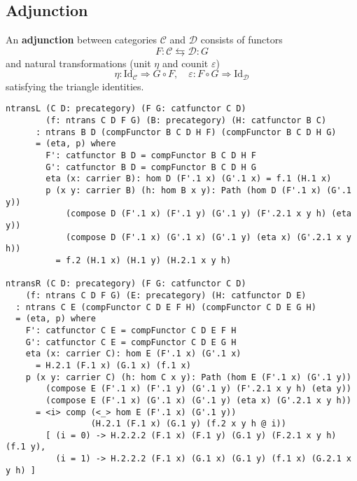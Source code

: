 \documentclass{article}
\begin{document}
\subsection{Adjunction}
An \textbf{adjunction} between categories $\mathcal{C}$ and $\mathcal{D}$ consists of functors
\[
F: \mathcal{C} \leftrightarrows \mathcal{D} : G
\]
and natural transformations (unit $\eta$ and counit $\varepsilon$)
\[
\eta: \mathrm{Id}_{\mathcal{C}} \Rightarrow G \circ F, \quad \varepsilon: F \circ G \Rightarrow \mathrm{Id}_{\mathcal{D}}
\]
satisfying the triangle identities.
\begin{lstlisting}
ntransL (C D: precategory) (F G: catfunctor C D)
        (f: ntrans C D F G) (B: precategory) (H: catfunctor B C)
      : ntrans B D (compFunctor B C D H F) (compFunctor B C D H G)
      = (eta, p) where
        F': catfunctor B D = compFunctor B C D H F
        G': catfunctor B D = compFunctor B C D H G
        eta (x: carrier B): hom D (F'.1 x) (G'.1 x) = f.1 (H.1 x)
        p (x y: carrier B) (h: hom B x y): Path (hom D (F'.1 x) (G'.1 y))
            (compose D (F'.1 x) (F'.1 y) (G'.1 y) (F'.2.1 x y h) (eta y))
            (compose D (F'.1 x) (G'.1 x) (G'.1 y) (eta x) (G'.2.1 x y h))
          = f.2 (H.1 x) (H.1 y) (H.2.1 x y h)

ntransR (C D: precategory) (F G: catfunctor C D)
    (f: ntrans C D F G) (E: precategory) (H: catfunctor D E)
  : ntrans C E (compFunctor C D E F H) (compFunctor C D E G H)
  = (eta, p) where
    F': catfunctor C E = compFunctor C D E F H
    G': catfunctor C E = compFunctor C D E G H
    eta (x: carrier C): hom E (F'.1 x) (G'.1 x)
      = H.2.1 (F.1 x) (G.1 x) (f.1 x)
    p (x y: carrier C) (h: hom C x y): Path (hom E (F'.1 x) (G'.1 y))
        (compose E (F'.1 x) (F'.1 y) (G'.1 y) (F'.2.1 x y h) (eta y))
        (compose E (F'.1 x) (G'.1 x) (G'.1 y) (eta x) (G'.2.1 x y h))
      = <i> comp (<_> hom E (F'.1 x) (G'.1 y))
                 (H.2.1 (F.1 x) (G.1 y) (f.2 x y h @ i))
        [ (i = 0) -> H.2.2.2 (F.1 x) (F.1 y) (G.1 y) (F.2.1 x y h) (f.1 y),
          (i = 1) -> H.2.2.2 (F.1 x) (G.1 x) (G.1 y) (f.1 x) (G.2.1 x y h) ]
\end{lstlisting}
\end{document}

